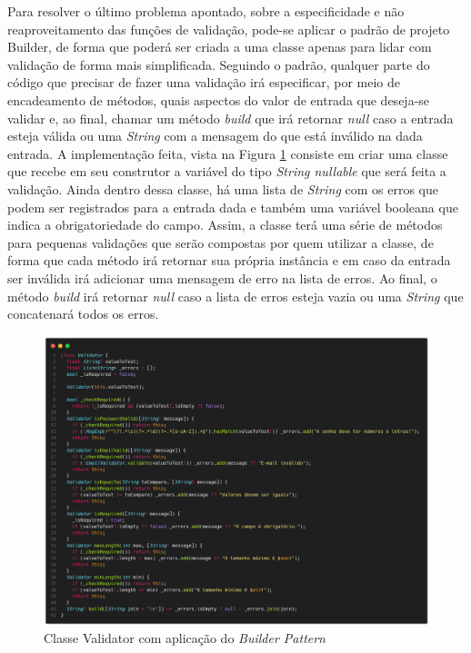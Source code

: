 \documentclass[12pt, %
openright, 
oneside, %
a4paper,    %
brazil]{facom-ufu-abntex2}
\begin{document}
Para resolver o último problema apontado, sobre a especificidade e não reaproveitamento das funções de validação, pode-se aplicar o padrão de projeto Builder, de forma que poderá ser criada a uma classe apenas para lidar com validação de forma mais simplificada. Seguindo o padrão, qualquer parte do código que precisar de fazer uma validação irá especificar, por meio de encadeamento de métodos, quais aspectos do valor de entrada que deseja-se validar e, ao final, chamar um método \textit{build} que irá retornar \textit{null} caso a entrada esteja válida ou uma \textit{String} com a mensagem do que está inválido na dada entrada. A implementação feita, vista na Figura \ref{fig:form_validator} consiste em criar uma classe que recebe em seu construtor a variável do tipo \textit{String nullable} que será feita a validação. Ainda dentro dessa classe, há uma lista de \textit{String} com os erros que podem ser registrados para a entrada dada e também uma variável booleana que indica a obrigatoriedade do campo. Assim, a classe terá uma série de métodos para pequenas validações que serão compostas por quem utilizar a classe, de forma que cada método irá retornar sua própria instância e em caso da entrada ser inválida irá adicionar uma mensagem de erro na lista de erros. Ao final, o método \textit{build} irá retornar \textit{null} caso a lista de erros esteja vazia ou uma \textit{String} que concatenará todos os erros.

\begin{figure}[ht]
    \centering
    \includegraphics[width=1\textwidth, trim={0 30 0 100}, clip]{figures/forms/form_validator.png}
    \caption{Classe Validator com aplicação do \textit{Builder Pattern}}
    \label{fig:form_validator}
\end{figure}
\end{document}
